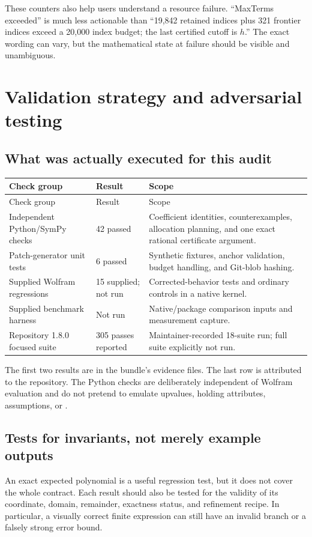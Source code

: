 \documentclass[11pt,a4paper]{article}
\newcommand{\code}[1]{\texttt{\detokenize{#1}}}
\theoremstyle{remark}\newtheorem{remark}[proposition]{Remark}
\begin{document}
These counters also help users understand a resource failure. ``MaxTerms exceeded'' is much less actionable than ``19,842 retained indices plus 321 frontier indices exceed a 20,000 index budget; the last certified cutoff is $h$.'' The exact wording can vary, but the mathematical state at failure should be visible and unambiguous.



\section{Validation strategy and adversarial testing}
\subsection{What was actually executed for this audit}
\begin{longtable}{P{0.3\textwidth}P{0.16\textwidth}P{0.44\textwidth}}
\toprule Check group & Result & Scope \\\midrule
\endfirsthead
\toprule Check group & Result & Scope \\\midrule
\endhead
Independent Python/SymPy checks & 42 passed & Coefficient identities, counterexamples, allocation planning, and one exact rational certificate argument. \\
Patch-generator unit tests & 6 passed & Synthetic fixtures, anchor validation, budget handling, and Git-blob hashing. \\
Supplied Wolfram regressions & 15 supplied; not run & Corrected-behavior tests and ordinary controls in a native kernel. \\
Supplied benchmark harness & Not run & Native/package comparison inputs and measurement capture. \\
Repository 1.8.0 focused suite & 305 passes reported & Maintainer-recorded 18-suite run; full suite explicitly not run. \\
\bottomrule
\end{longtable}
The first two results are in the bundle's evidence files. The last row is attributed to the repository. The Python checks are deliberately independent of Wolfram evaluation and do not pretend to emulate upvalues, holding attributes, assumptions, or \code{SeriesData}.\cite{validation}

\subsection{Tests for invariants, not merely example outputs}
An exact expected polynomial is a useful regression test, but it does not cover the whole contract. Each result should also be tested for the validity of its coordinate, domain, remainder, exactness status, and refinement recipe. In particular, a visually correct finite expression can still have an invalid branch or a falsely strong error bound.
\end{document}
